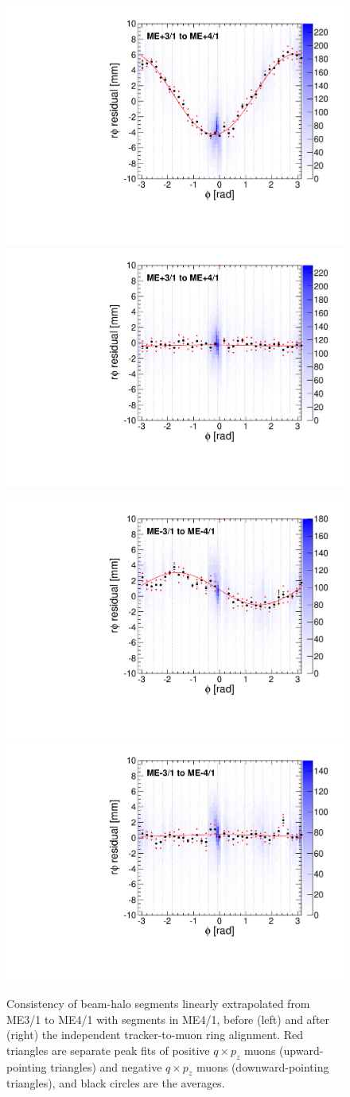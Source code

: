 \documentclass[12pt]{article}
\begin{document}
\begin{figure}
\begin{center}
\includegraphics[width=0.4\linewidth]{BHCrossCheck_mep41_before.pdf}
\includegraphics[width=0.4\linewidth]{BHCrossCheck_mep41_after.pdf}

\includegraphics[width=0.4\linewidth]{BHCrossCheck_mem41_before.pdf}
\includegraphics[width=0.4\linewidth]{BHCrossCheck_mem41_after.pdf}
\end{center}

\caption{Consistency of beam-halo segments linearly extrapolated from
  ME3/1 to ME4/1 with segments in ME4/1, before (left) and after
  (right) the independent tracker-to-muon ring alignment.  Red
  triangles are separate peak fits of positive $q\times p_z$ muons
  (upward-pointing triangles) and negative $q\times p_z$ muons
  (downward-pointing triangles), and black circles are the
  averages. \label{fig:BHCrossCheck_me41}}
\end{figure}
\end{document}
